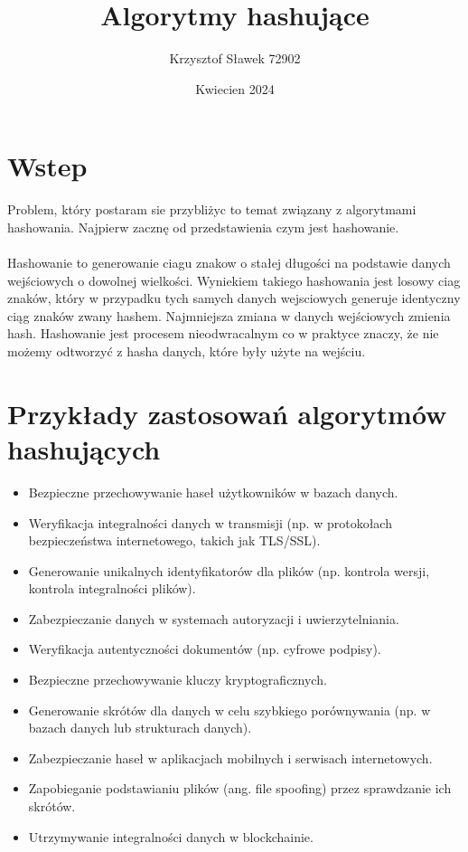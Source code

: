 \documentclass{article}
\title{Algorytmy hashujące}
\author{Krzysztof Sławek 72902}
\date{Kwiecien 2024}
\begin{document}
\maketitle

\section{Wstep}

Problem, który postaram sie przybliżyc to temat związany z algorytmami hashowania.
Najpierw zacznę od przedstawienia czym jest hashowanie.
\\
\\
Hashowanie to generowanie ciagu znakow o stałej długości na podstawie danych wejściowych o dowolnej wielkości. Wyniekiem takiego hashowania jest losowy ciag znaków, który w przypadku tych samych danych wejsciowych generuje identyczny ciąg znaków zwany hashem. Najmniejsza zmiana w danych wejściowych zmienia hash. 
Hashowanie jest procesem nieodwracalnym co w praktyce znaczy, że nie możemy odtworzyć z hasha danych, które były użyte na wejściu.

\section{Przykłady zastosowań algorytmów hashujących}

\begin{itemize}
    \item Bezpieczne przechowywanie haseł użytkowników w bazach danych.
    \item Weryfikacja integralności danych w transmisji 
    (np. w protokołach bezpieczeństwa internetowego, takich jak TLS/SSL).
    \item Generowanie unikalnych identyfikatorów dla plików (np. kontrola wersji, kontrola integralności plików).
    \item Zabezpieczanie danych w systemach autoryzacji i uwierzytelniania.
    \item Weryfikacja autentyczności dokumentów (np. cyfrowe podpisy).
    \item Bezpieczne przechowywanie kluczy kryptograficznych.
    \item Generowanie skrótów dla danych w celu szybkiego porównywania (np. w bazach danych lub strukturach danych).
    \item Zabezpieczanie haseł w aplikacjach mobilnych i serwisach internetowych.
    \item Zapobieganie podstawianiu plików (ang. file spoofing) przez sprawdzanie ich skrótów.
    \item Utrzymywanie integralności danych w blockchainie.
\end{itemize}
\end{document}
